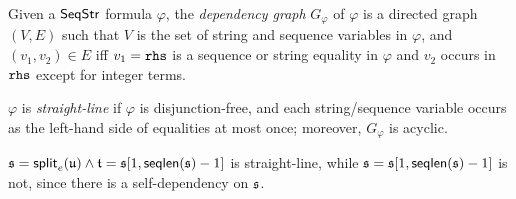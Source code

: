 
\begin{definition}\label{def:straight_line}
	Given a ${\sf SeqStr}$ formula $\varphi$, 
	 the \emph{dependency graph} $G_\varphi$ of  $\varphi$
	 is a directed graph $(V,E)$ such that
	$V$ is  the set of string and sequence variables in $\varphi$, and %
	 $(v_1, v_2)\in E$ %
	iff  $v_1 = {\tt rhs}$ is a sequence or string equality in $\varphi$ and $v_2$ occurs in ${\tt rhs}$ except for integer terms.

$\varphi$ is \emph{straight-line} if $\varphi$ is disjunction-free, and each string/sequence variable occurs as the left-hand side of equalities at most once; moreover, $G_\varphi$ is acyclic.

\end{definition}

\begin{example}
$\mathfrak{s} = \mathsf{split}_e(\mathfrak{u}) \wedge \mathfrak{t} = \mathfrak{s}[1, \mathsf{seqlen}(\mathfrak{s}) - 1]$ is  straight-line, while  $\mathfrak{s} = \mathfrak{s}[1, \mathsf{seqlen}(\mathfrak{s}) - 1]$ is not, since there is a self-dependency on $\mathfrak{s}$.
\end{example}



